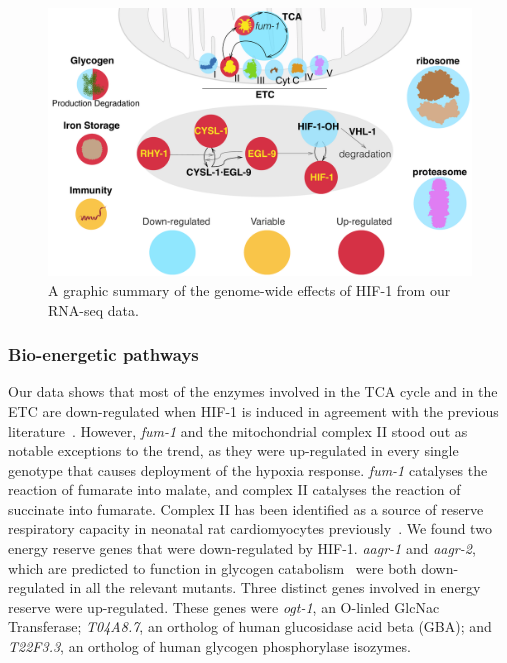 \documentclass[9pt,twocolumn,twoside]{pnas-new}
\newcommand{\gene}[1]{\emph{#1}}
\newcommand{\hifp}{HIF-1}
\begin{document}
\begin{figure}[tbhp]
\centering
\includegraphics[width=\linewidth]{figs/hif1genomewide.pdf}
\caption{
A graphic summary of the genome-wide effects of \hifp{} from our RNA-seq data.
}
\label{fig:genomewide}
\end{figure}


\subsubsection{Bio-energetic pathways}

Our data shows that most of the enzymes involved in the TCA cycle and in the ETC
are down-regulated when \hifp{} is induced in agreement with the previous
literature~\cite{Semenza2012}.
However,
\gene{fum-1} and the mitochondrial complex II stood out as notable exceptions to
the trend, as they were up-regulated in every single genotype that causes
deployment of the hypoxia response. \gene{fum-1} catalyses the reaction of
fumarate into malate, and complex II catalyses the reaction of succinate into
fumarate. Complex II has been identified as a source of reserve respiratory capacity
in neonatal rat cardiomyocytes previously~\cite{Pfleger2015}.
We found two energy reserve genes that were down-regulated by \hifp{}. \gene{aagr-1}
and \gene{aagr-2}, which are predicted to function in glycogen
catabolism~\cite{Sikora2010} were both down-regulated in all the relevant mutants.
Three distinct genes involved in energy reserve were up-regulated. These genes were
\gene{ogt-1}, an O-linled GlcNac Transferase; \gene{T04A8.7}, an ortholog of human
glucosidase acid beta (GBA); and \gene{T22F3.3}, an ortholog of human glycogen
phosphorylase isozymes.
\end{document}

